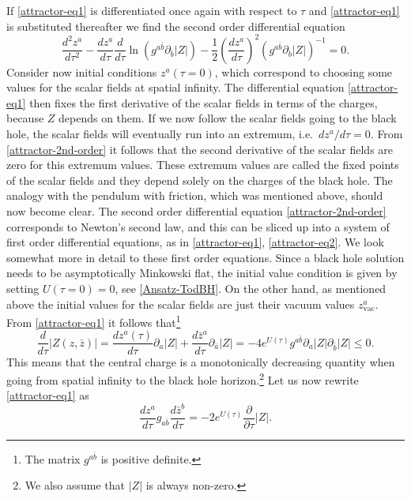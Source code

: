 \documentclass[12pt,twoside]{book}
\begin{document}
If \eqref{attractor-eq1} is differentiated once again with respect to $\tau$ and \eqref{attractor-eq1} is substituted thereafter we find the second order differential equation
\begin{equation}\label{attractor-2nd-order}
\frac{d^{2}z^{a}}{d\tau^{2}} - \frac{dz^{a}}{d\tau} \frac{d}{d\tau}\ln \left( g^{a\bar{b}}\partial_{\bar{b}} |Z| \right) -
\frac{1}{2}\left( \frac{dz^{a}}{d\tau} \right)^{2} \left( g^{a\bar{b}}\partial_{\bar{b}} |Z| \right)^{-1} = 0.
\end{equation}
Consider now initial conditions $z^{a}(\tau=0)$, which correspond to choosing some values for the scalar fields at spatial infinity. The differential equation \eqref{attractor-eq1} then fixes the first derivative of the scalar fields in terms of the charges, because $Z$ depends on them. If we now follow the scalar fields going to the black hole, the scalar fields will eventually run into an extremum, i.e.\ $dz^{a}/d\tau = 0$. From \eqref{attractor-2nd-order} it follows that the second derivative of the scalar fields are zero for this extremum values. These extremum values are called the fixed points of the scalar fields and they depend solely on the charges of the black hole. The analogy with the pendulum with friction, which was mentioned above, should now become clear. The second order differential equation \eqref{attractor-2nd-order} corresponds to Newton's second law, and this can be sliced up into a system of first order differential equations, as in \eqref{attractor-eq1}, \eqref{attractor-eq2}. 
We look somewhat more in detail to these first order equations. Since a black hole solution needs to be asymptotically Minkowski flat, the initial value condition is given by setting $U(\tau = 0) = 0$, see \eqref{Ansatz-TodBH}. On the other hand, as mentioned above the initial values for the scalar fields are just their vacuum values $z^{a}_{\mathrm{vac}}$. 
From \eqref{attractor-eq1} it follows that\footnote{The matrix $g^{a\bar{b}}$ is positive definite.} \cite{string-bbs}
\begin{equation}
\frac{d}{d\tau}|Z(z,\bar{z})| = \frac{dz^{a}(\tau)}{d\tau}\partial_{a}|Z| + \frac{d\bar{z}^{a}}{d\tau}\partial_{\bar{a}}|Z|
 = -4e^{U(\tau)} g^{a\bar{b}} \partial_{a}|Z| \partial_{\bar{b}}|Z| \leq 0.
\end{equation}
This means that the central charge is a monotonically decreasing quantity when going from spatial infinity to the black hole horizon.\footnote{We also assume that $|Z|$ is always non-zero.} Let us now rewrite \eqref{attractor-eq1} as
%
\begin{equation}\label{attractor-eq1-bis}
\frac{dz^{a}}{d\tau} g_{a \bar{b}} \frac{d\bar{z}^{b}}{d\tau} = -2 e^{U(\tau)} \frac{\partial}{\partial \tau}|Z|.
\end{equation}
\end{document}
